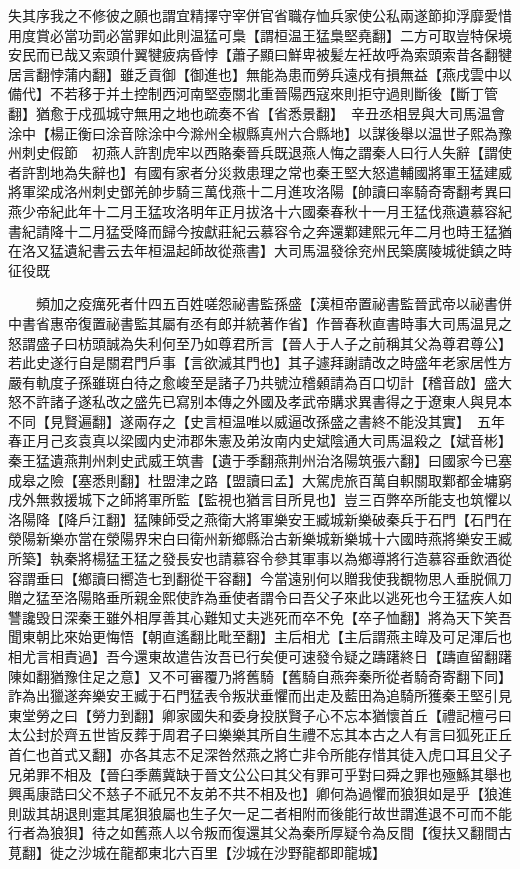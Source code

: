 失其序我之不修彼之願也謂宜精擇守宰併官省職存恤兵家使公私兩遂節抑浮靡愛惜用度賞必當功罰必當罪如此則温猛可梟【謂桓温王猛梟堅堯翻】二方可取豈特保境安民而已哉又索頭什翼犍疲病昏悖【蕭子顯曰鮮卑被髪左衽故呼為索頭索昔各翻犍居言翻悖蒲内翻】雖乏貢御【御進也】無能為患而勞兵遠戍有損無益【燕戌雲中以備代】不若移于并土控制西河南堅壺關北重晉陽西寇來則拒守過則斷後【斷丁管翻】猶愈于戍孤城守無用之地也疏奏不省【省悉景翻】　辛丑丞相昱與大司馬温會涂中【楊正衡曰涂音除涂中今滁州全椒縣真州六合縣地】以謀後舉以温世子熙為豫州刺史假節　初燕人許割虎牢以西賂秦晉兵既退燕人悔之謂秦人曰行人失辭【謂使者許割地為失辭也】有國有家者分災救患理之常也秦王堅大怒遣輔國將軍王猛建威將軍梁成洛州刺史鄧羌帥步騎三萬伐燕十二月進攻洛陽【帥讀曰率騎奇寄翻考異曰燕少帝紀此年十二月王猛攻洛明年正月拔洛十六國秦春秋十一月王猛伐燕遺慕容紀書紀請降十二月猛受降而歸今按獻莊紀云慕容令之奔還鄴建熙元年二月也時王猛猶在洛又猛遺紀書云去年桓温起師故從燕書】大司馬温發徐兖州民築廣陵城徙鎮之時征役既

　　頻加之疫癘死者什四五百姓嗟怨祕書監孫盛【漢桓帝置祕書監晉武帝以祕書併中書省惠帝復置祕書監其屬有丞有郎并統著作省】作晉春秋直書時事大司馬温見之怒謂盛子曰枋頭誠為失利何至乃如尊君所言【晉人于人子之前稱其父為尊君尊公】若此史遂行自是關君門戶事【言欲滅其門也】其子遽拜謝請改之時盛年老家居性方嚴有軌度子孫雖斑白待之愈峻至是諸子乃共號泣稽顙請為百口切計【稽音啟】盛大怒不許諸子遂私改之盛先已寫别本傳之外國及孝武帝購求異書得之于遼東人與見本不同【見賢遍翻】遂兩存之【史言桓温唯以威逼改孫盛之書終不能没其實】　五年春正月己亥袁真以梁國内史沛郡朱憲及弟汝南内史斌陰通大司馬温殺之【斌音彬】　秦王猛遺燕荆州刺史武威王筑書【遺于季翻燕荆州治洛陽筑張六翻】曰國家今已塞成皋之險【塞悉則翻】杜盟津之路【盟讀曰孟】大駕虎旅百萬自軹關取鄴都金墉窮戌外無救援城下之師將軍所監【監視也猶言目所見也】豈三百弊卒所能支也筑懼以洛陽降【降戶江翻】猛陳師受之燕衛大將軍樂安王臧城新樂破秦兵于石門【石門在滎陽新樂亦當在滎陽界宋白曰衛州新鄉縣治古新樂城新樂城十六國時燕將樂安王臧所築】執秦將楊猛王猛之發長安也請慕容令參其軍事以為鄉導將行造慕容垂飲酒從容謂垂曰【鄉讀曰嚮造七到翻從干容翻】今當遠别何以贈我使我覩物思人垂脱佩刀贈之猛至洛陽賂垂所親金熙使詐為垂使者謂令曰吾父子來此以逃死也今王猛疾人如讐讒毁日深秦王雖外相厚善其心難知丈夫逃死而卒不免【卒子恤翻】將為天下笑吾聞東朝比來始更悔悟【朝直遙翻比毗至翻】主后相尤【主后謂燕主暐及可足渾后也相尤言相責過】吾今還東故遣告汝吾已行矣便可速發令疑之躊躇終日【躊直留翻躇陳如翻猶豫住足之意】又不可審覆乃將舊騎【舊騎自燕奔秦所從者騎奇寄翻下同】詐為出獵遂奔樂安王臧于石門猛表令叛狀垂懼而出走及藍田為追騎所獲秦王堅引見東堂勞之曰【勞力到翻】卿家國失和委身投朕賢子心不忘本猶懷首丘【禮記檀弓曰太公封於齊五世皆反葬于周君子曰樂樂其所自生禮不忘其本古之人有言曰狐死正丘首仁也首式又翻】亦各其志不足深咎然燕之將亡非令所能存惜其徒入虎口耳且父子兄弟罪不相及【晉臼季薦冀缺于晉文公公曰其父有罪可乎對曰舜之罪也殛鯀其舉也興禹康誥曰父不慈子不祇兄不友弟不共不相及也】卿何為過懼而狼狽如是乎【狼進則跋其胡退則疐其尾狽狼屬也生子欠一足二者相附而後能行故世謂進退不可而不能行者為狼狽】待之如舊燕人以令叛而復還其父為秦所厚疑令為反間【復扶又翻間古莧翻】徙之沙城在龍都東北六百里【沙城在沙野龍都即龍城】

